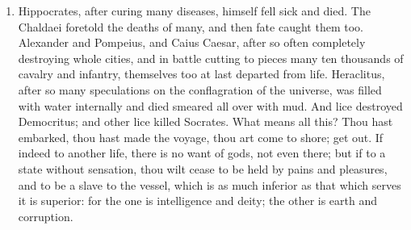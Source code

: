 \begin{enumerate}
\item Hippocrates, after curing many diseases, himself fell sick and died. The Chaldaei foretold the deaths of many, and then fate caught them too. Alexander and Pompeius, and Caius Caesar, after so often completely destroying whole cities, and in battle cutting to pieces many ten thousands of cavalry and infantry, themselves too at last departed from life. Heraclitus, after so many speculations on the conflagration of the universe, was filled with water internally and died smeared all over with mud. And lice destroyed Democritus; and other lice killed Socrates. What means all this? Thou hast embarked, thou hast made the voyage, thou art come to shore; get out. If indeed to another life, there is no want of gods, not even there; but if to a state without sensation, thou wilt cease to be held by pains and pleasures, and to be a slave to the vessel, which is as much inferior as that which serves it is superior: for the one is intelligence and deity; the other is earth and corruption.


\end{enumerate}

